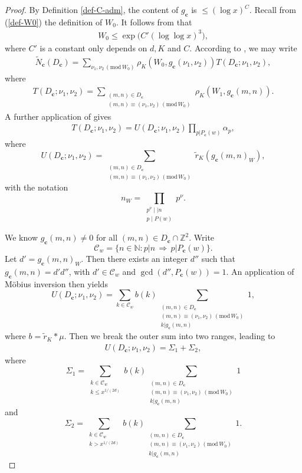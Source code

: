 \documentclass[reqno, 11pt]{amsart}
\renewcommand{\leq}{\leqslant}
\theoremstyle{definition}
\theoremstyle{definition}
\renewcommand{\leq}{\leqslant}
\renewcommand{\mod}{\mathrm{mod}\,}
\newcommand{\cc}{\mathbf{c}}
\newcommand{\ZZ}{\mathbb{Z}}
\newcommand{\NN}{\mathbb{N}}
\numberwithin{equation}{section}
\begin{document}
\begin{proof}
	By Definition \ref{def-C-adm}, the content of $g_\cc$ is $\leq (\log x)^C$. Recall from  (\ref{def-W0}) the definition of $W_0$. It follows from \cite[Formula (9.4)]{BST} that
	\begin{align}\label{bound-W0}
		W_0 \leq \exp\big(C'(\log \log x)^3\big),
	\end{align}
	where $C'$ is a constant only depends on $d, K$ and $C$.
    According to \cite[Formula (9.5)]{BST}, we may write
	\begin{align}\label{BST-9.5}
		\tilde{N}_\cc(D_\cc) = \sum_{\nu_1, \nu_2 \, (\mod W_0)} \rho_K(W_0, g_\cc(\nu_1, \nu_2))T(D_\cc; \nu_1, \nu_2),
	\end{align} 
	where 
	\begin{align}\label{def-T}
		T(D_\cc; \nu_1, \nu_2) = \sum_{\substack{(m,n) \in D_\cc \\ (m, n) \equiv (\nu_1, \nu_2) \, (\mod W_0)}} \rho_K(W_1, g_\cc(m, n)).
	\end{align}
	A further application of \cite[Formula (9.6)]{BST} gives
	\begin{align}\label{BST-9.6}
		T(D_\cc; \nu_1, \nu_2) = U(D_\cc; \nu_1, \nu_2) \prod_{p | P_\cc(w)} \alpha_p,
 	\end{align}
 	where
 	$$U(D_\cc; \nu_1, \nu_2) = \sum_{\substack{(m,n) \in D_\cc \\ (m,n) \equiv (\nu_1, \nu_2) \, (\mod W_0)}} \tilde{r}_K(g_\cc(m,n)_W),$$
 	with the notation 
 	$$n_W = \prod_{\substack{p^\nu \mid\mid n \\ p \mid P(w)}} p^\nu.$$
 	
We know  $g_\cc(m, n) \neq 0$ for all $(m, n) \in D_\cc \cap \ZZ^2$. Write
$$\mathcal{C}_w = \{n \in \NN: p | n \, \Rightarrow \, p | P_\cc(w)\}.$$
Let $d' = g_\cc(m, n)_W$. Then there exists an integer $d''$ such that $g_\cc(m, n) = d'd''$, with $d' \in \mathcal{C}_w$ and $\gcd(d'', P_\cc(w)) = 1$. An application of M\"obius inversion then yields
$$U(D_\cc; \nu_1, \nu_2) = \sum_{k \in \mathcal{C}_w} b(k) \sum_{\substack{(m, n) \in D_\cc \\ (m, n) \equiv (\nu_1, \nu_2) \, (\mod W_0) \\ k | g_{\cc}(m, n)}} 1,$$
where $b = \tilde{r}_K * \mu$. Then we break the outer sum into two ranges, leading to
\begin{align}\label{BST-9.7}
	U(D_\cc; \nu_1, \nu_2) = \Sigma_1 + \Sigma_2,
\end{align}
where
$$\Sigma_1 = \sum_{\substack{k \in \mathcal{C}_w \\ k \leq x^{1/(2d)}}} b(k) \sum_{\substack{(m, n) \in D_\cc \\ (m, n) \equiv (\nu_1, \nu_2) \, (\mod W_0) \\ k | g_{\cc}(m, n)}} 1$$
and
$$\Sigma_2 = \sum_{\substack{k \in \mathcal{C}_w \\ k > x^{1/(2d)}}} b(k) \sum_{\substack{(m, n) \in D_\cc \\ (m, n) \equiv (\nu_1, \nu_2) \, (\mod W_0) \\ k | g_{\cc}(m, n)}} 1 .$$


\end{proof}
\end{document}
